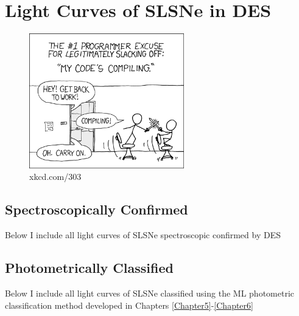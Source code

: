 \chapter{Light Curves of SLSNe in DES}
\label{AppendixA}

\begin{figure}[H]
  \includegraphics[width=0.6\textwidth]{Figures/xkcd/appendix.png}
  \caption*{xkcd.com/303}
\end{figure}

\section{Spectroscopically Confirmed}
Below I include all light curves of SLSNe spectroscopic confirmed by DES

\section{Photometrically Classified}
Below I include all light curves of SLSNe classified using the ML photometric classification method developed in Chapters \ref{Chapter5}-\ref{Chapter6}
